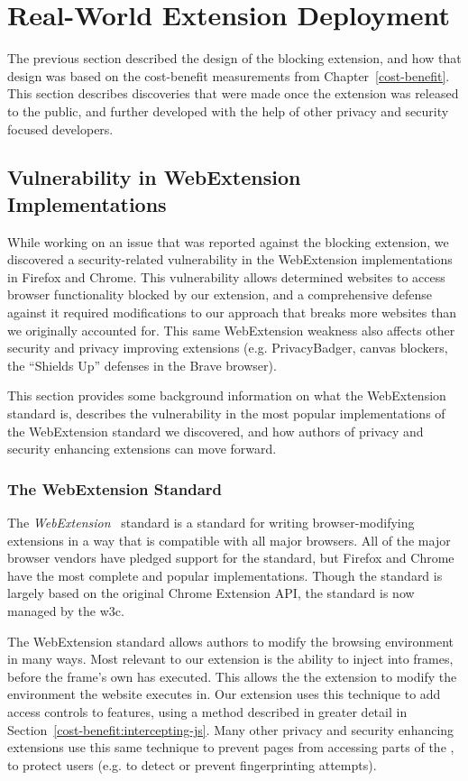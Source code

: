 \section{Real-World Extension Deployment}
\label{current-web:extension-deployment}
The previous section described the design of the \WAPI blocking extension, and
how that design was based on the cost-benefit measurements from
Chapter~\ref{cost-benefit}.  This section describes discoveries that were
made once the extension was released to the public, and further
developed with the help of other privacy and security focused developers.


\subsection{Vulnerability in WebExtension Implementations}
While working on an issue that was reported against the blocking extension, we
discovered a security-related vulnerability in the WebExtension implementations
in Firefox and Chrome.  This vulnerability allows determined websites to access
browser functionality blocked by our extension, and a comprehensive defense
against it required modifications to our approach that breaks more websites
than we originally accounted for.  This same WebExtension weakness also affects
other security and privacy improving extensions (e.g. PrivacyBadger, canvas
blockers, the ``Shields Up'' defenses in the Brave browser).

This section provides some background information on what the WebExtension
standard is, describes the vulnerability in the most popular
implementations of the WebExtension standard we discovered,
and how authors of privacy and security enhancing extensions can move forward.


\subsubsection{The WebExtension Standard}
The \textit{WebExtension}~\cite{webext2018standard} standard is a standard
for writing browser-modifying extensions in a way that is compatible
with all major browsers.  All of the major browser vendors have pledged
support for the standard, but Firefox and Chrome have the most complete
and popular implementations.  Though the standard is largely based on
the original Chrome Extension API, the standard is now managed by the \gls{w3c}.

The WebExtension standard allows authors to modify the browsing environment
in many ways.  Most relevant to our extension is the ability to inject
\JS into frames, before the frame's own \JS has executed.  This allows the
the extension to modify the environment the website executes in.  Our extension
uses this technique to add access controls to \WAPI features, using a method
described in greater detail in Section~\ref{cost-benefit:intercepting-js}.
Many other privacy and security enhancing extensions use
this same technique to prevent pages from accessing parts of the \WAPI, to
protect users (e.g. to detect or prevent fingerprinting attempts).


